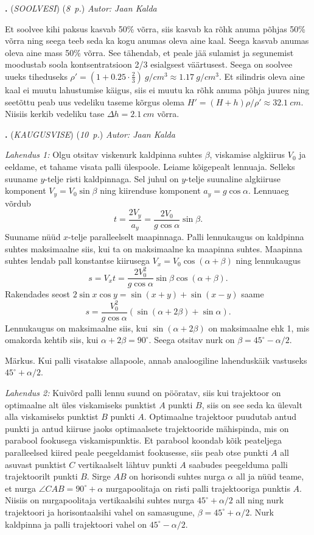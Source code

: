 \documentclass[11pt,a5paper]{article}
\newcommand{\numb}[1]{\vspace{5pt}\textbf{\large #1}}
\newcommand{\nimi}[1]{(\textsl{\small #1})}
\newcommand{\punktid}[1]{(\emph{#1~p.})}
\newcounter{ylesanne}
\newcommand{\yl}[1]{\addtocounter{ylesanne}{1}\numb{\theylesanne.} \nimi{#1} \newblock{}}
\newcommand{\autor}[1]{\emph{ Autor: #1}}%
\begin{document}
\yl{SOOLVESI}
\punktid{8} \autor{Jaan Kalda}

Et soolvee kihi paksus kasvab 50\% võrra, siis kasvab ka rõhk anuma põhjas 50\% võrra ning seega teeb seda ka kogu anumas oleva aine kaal. Seega kasvab anumas oleva aine mass 50\% võrra. See tähendab, et peale jää sulamist ja segunemist moodustab soola kontsentratsioon 2/3 esialgsest väärtusest. Seega on soolvee uueks tiheduseks $\rho'=(1+0.25\cdot \frac 23)\SI{}{g/cm^3}\approx \SI{1.17}{g/cm^3}$. Et silindris oleva aine kaal ei muutu lahustumise käigus, siis ei muutu ka rõhk anuma põhja juures ning seetõttu peab uus vedeliku taseme kõrgus olema $H'=(H+h)\rho/\rho'\approx \SI{32.1}{cm}$. Niisiis kerkib vedeliku tase  $\Delta h=\SI{2.1}{cm}$ võrra.

\yl{KAUGUSVISE}
\punktid{10} \autor{Jaan Kalda}

\emph{Lahendus 1:} Olgu otsitav viskenurk kaldpinna suhtes $\beta$, viskamise algkiirus $V_0$ ja eeldame, et tahame visata palli ülespoole. Leiame kõigepealt lennuaja. Selleks suuname $y$-telje risti kaldpinnaga. Sel juhul on $y$-telje suunaline algkiiruse komponent $V_y=V_0\sin\beta$ ning kiirenduse komponent $a_y=g\cos\alpha$. Lennuaeg võrdub
$$t=\frac{2V_y}{a_y}=\frac{2V_0}{g\cos\alpha}\sin\beta.$$
Suuname nüüd $x$-telje paralleelselt maapinnaga. Palli lennukaugus on kaldpinna suhtes maksimaalne siis, kui ta on maksimaalne ka maapinna suhtes. Maapinna suhtes lendab pall konstantse kiirusega $V_x=V_0\cos(\alpha+\beta)$ ning lennukaugus
$$s=V_xt=\frac{2V_0^2}{g\cos\alpha}\sin\beta\cos(\alpha+\beta).$$
Rakendades seost $2\sin x\cos y=\sin(x+y)+\sin(x-y)$ saame
$$s=\frac{V_0^2}{g\cos\alpha}(\sin(\alpha+2\beta)+\sin\alpha).$$
Lennukaugus on maksimaalne siis, kui $\sin(\alpha+2\beta)$ on maksimaalne ehk 1, mis omakorda kehtib siis, kui $\alpha+2\beta=90^\circ$. Seega otsitav nurk on $\beta =45^\circ-\alpha /2$.

Märkus. Kui palli visatakse allapoole, annab analoogiline lahenduskäik vastuseks $45^\circ+\alpha /2$.

\emph{Lahendus 2:} Kuivõrd palli lennu suund on pööratav, siis kui trajektoor on optimaalne alt üles viskamiseks punktist $A$ punkti $B$, siis on see seda ka ülevalt alla viskamiseks punktist $B$ punkti $A$. Optimaalne trajektoor puudutab antud punkti ja antud kiiruse jaoks optimaalsete trajektooride mähispinda, mis on parabool fookusega viskamispunktis. Et parabool koondab kõik peateljega paralleelsed kiired peale peegeldamist fookusesse, siis peab otse punkti $A$ all asuvast punktist $C$ vertikaalselt lähtuv punkti $A$ saabudes peegelduma palli trajektoorilt punkti $B$. Sirge $AB$ on horisondi suhtes nurga $\alpha$ all ja nüüd teame, et nurga $\angle CAB=90^\circ +\alpha$ nurgapoolitaja on risti palli trajektooriga punktis $A$. Niisiis on nurgapoolitaja vertikaalsihi suhtes nurga $45^\circ +\alpha/2$ all ning nurk trajektoori ja horisontaalsihi vahel on samasugune, $\beta = 45^\circ +\alpha/2$. Nurk kaldpinna ja palli trajektoori vahel on $45^\circ -\alpha/2$.
\end{document}
